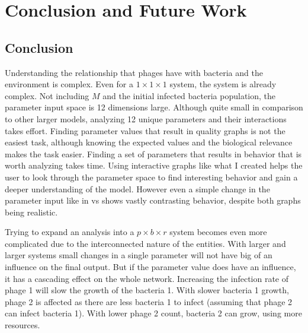 \chapter{Conclusion and Future Work}
\label{CAFW}

\section{Conclusion}
\label{Conclusion}
Understanding the relationship that phages have with bacteria and the environment is complex. 
Even for a $1\times1\times1$ system, the system is already complex. 
Not including $M$ and the initial infected bacteria population, the parameter input space is 12 dimensions large. 
Although quite small in comparison to other larger models, analyzing 12 unique parameters and their interactions takes effort. 
Finding parameter values that result in quality graphs is not the easiest task, although knowing the expected values and the biological relevance makes the task easier. 
Finding a set of parameters that results in behavior that is worth analyzing takes time. 
Using interactive graphs like what I created helps the user to look through the parameter space to find interesting behavior and gain a deeper understanding of the model. 
However even a simple change in the parameter input like in  vs  shows vastly contrasting behavior, despite both graphs being realistic. 

Trying to expand an analysis into a $p\times b\times r$ system becomes even more complicated due to the interconnected nature of the entities. 
With larger and larger systems small changes in a single parameter will not have big of an influence on the final output. 
But if the parameter value does have an influence, it has a cascading effect on the whole network. 
Increasing the infection rate of phage 1 will slow the growth of the bacteria 1. 
With slower bacteria 1 growth, phage 2 is affected as there are less bacteria 1 to infect (assuming that phage 2 can infect bacteria 1). With lower phage 2 count, bacteria 2 can grow, using more resources. 


